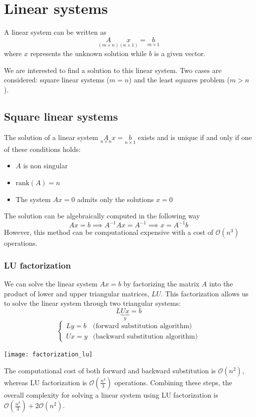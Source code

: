 \documentclass{article}
\begin{document}
\section{Linear systems}
A linear system can be written as 
$$\underset{(m\times n)}A\underset{(n\times1)}x=\underset{m\times1}b$$
where $x$ represents the unknown solution while $b$ is a given vector.

We are interested to find a solution to this linear system. Two cases are
considered: square linear systems ($m=n$) and the least squares problem
($m>n$). 
\subsection{Square linear systems}
\begin{proposition}
    The solution of a linear system $\underset{n\times n}Ax=\underset{n\times
    1}b$ exists and is unique if and only if one of these conditions holds:
    \begin{itemize}
        \item $A$ is non singular 
        \item $\text{rank}(A)=n$
        \item The system $Ax=0$ admits only the solutions $x=0$
    \end{itemize}
\end{proposition}
The solution can be algebraically computed in the following way 
$$Ax=b\implies A^{-1}Ax=A^{-1}\implies x=A^{-1}b$$
However, this method can be computational expensive with a cost of
$\mathcal{O}(n^3)$ operations.
\subsubsection{LU factorization}
We can solve the linear system $Ax=b$ by factorizing the matrix $A$ into the
product of lower and upper triangular matrices, $LU$. This factorization
allows us to solve the linear system through two triangular systems:
$$L\underbrace{Ux}_{y}=b$$
$$\begin{cases}
    Ly=b & \text{(forward substitution algorithm)}\\
    Ux=y & \text{(backward substitution algorithm)}
\end{cases}$$
\begin{center}
    \texttt{[image: factorization\_lu]}
\end{center}
The computational cost of both forward and backward substitution is
$\mathcal{O}(n^2)$, whereas LU factorization is $\mathcal{O}(\frac{n^3}{3})$
operations. Combining these steps, the overall complexity for solving a linear
system using LU factorization is $\mathcal{O}(\frac{n^3}{3})+
2\mathcal{O}(n^2)$. 
\end{document}
